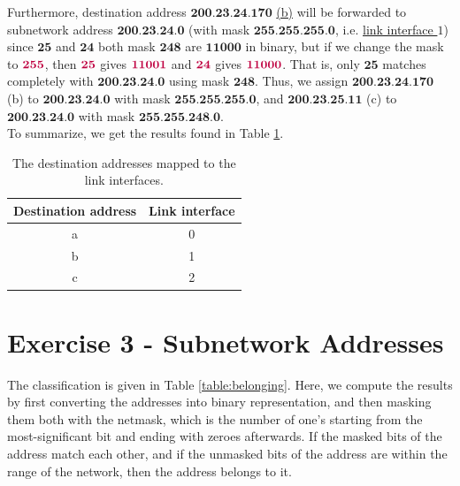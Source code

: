 \documentclass[10pt]{article}
\begin{document}
Furthermore, destination address $\textbf{200.23.24.170}$ \underline{(b)} will be forwarded to subnetwork address $\textbf{200.23.24.0}$ (with mask $\textbf{255.255.255.0}$, i.e. \underline{link interface $1$}) since {\color{teal}$\textbf{25}$} and {\color{teal}$\textbf{24}$} both mask {\color{teal}$\textbf{248}$} are {\color{teal}$\textbf{11000}$} in binary, but if we change the mask to ${\color{purple}\textbf{255}}$, then ${\color{purple}\textbf{25}}$ gives ${\color{purple}\textbf{11001}}$ and ${\color{purple}\textbf{24}}$ gives ${\color{purple}\textbf{11000}}$. That is, only $\textbf{25}$ matches completely with $\textbf{200.23.24.0}$ using mask $\textbf{248}$. Thus, we assign $\textbf{200.23.24.170}$ (b) to $\textbf{200.23.24.0}$ with mask $\textbf{255.255.255.0}$, and $\textbf{200.23.25.11}$ (c) to $\textbf{200.23.24.0}$ with mask $\textbf{255.255.248.0}$. \\

To summarize, we get the results found in Table \ref{table:results}.
\begin{table}[H]
  \centering
  \begin{tabular}{| c | c |}
   \hline
    \textbf{Destination address} & \textbf{Link interface} \\ \hline
    a & 0 \\ \hline
    b & 1 \\ \hline
    c & 2 \\ \hline
  \end{tabular}
  \caption{The destination addresses mapped to the link interfaces.}
  \label{table:results}
\end{table}
\section{Exercise 3 - Subnetwork Addresses}
The classification is given in Table \ref{table:belonging}. Here, we compute the results by first converting the addresses into binary representation, and then masking them both with the netmask, which is the number of one's starting from the most-significant bit and ending with zeroes afterwards. If the masked bits of the address match each other, and if the unmasked bits of the address are within the range of the network, then the address belongs to it. \\
\end{document}
